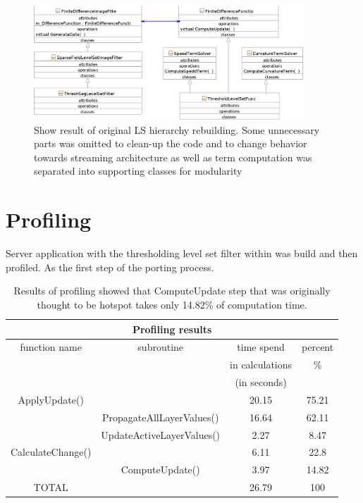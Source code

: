 \begin{figure}
    \centering
    \includegraphics[width=0.9\textwidth]{data/resultingFilter}
    \caption[Resulting level set filter ready to be ported to Cell/B.E.]
    {
Show result of original LS hierarchy rebuilding.
Some unnecessary parts was omitted to clean-up the code and to change behavior towards streaming architecture as well as term computation was separated into supporting classes for modularity
    }
    \label{fg:resultingFilter}
\end{figure}

\section{Profiling}

Server application with the thresholding level set filter within was build and then profiled. As the first step of the porting process.

\begin{table}
\centering
\begin{tabular}{|c|c|c|c|}
\hline
\multicolumn{4}{|c|}{Profiling results}\\
\hline
function name&subroutine&time spend&percent\\&&in calculations&\%\\&&(in seconds)&\\
\hline
\hline
ApplyUpdate()	&				&	20.15&	75.21\\
\hline
		&PropagateAllLayerValues()	&	16.64&	62.11\\
\hline
		&UpdateActiveLayerValues()	&	2.27&	8.47\\
\hline
CalculateChange()&				&	6.11&	22.8\\
\hline
		&ComputeUpdate()		&	3.97&	14.82\\
\hline
TOTAL		&				&	26.79&	100\\
\hline
\end{tabular}
\par
\caption[Profiling results]
{
  Results of profiling showed that ComputeUpdate step that was originally thought to be hotspot takes only 14.82\% of computation time.
}
\label{tab:profilingresults}
\end{table}

